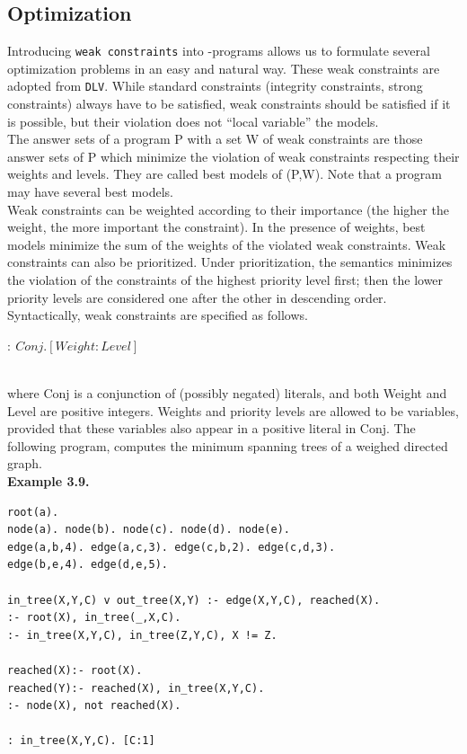 \documentclass[14pt,a4paper, titlepage]{article}
\begin{document}
\subsection{Optimization}
Introducing \texttt{weak constraints} into \hex-programs allows us to formulate several optimization problems in an easy and natural way. These weak constraints are adopted from \texttt{DLV}. While standard constraints (integrity constraints, strong constraints) always have to be satisfied, weak constraints should be satisfied if it is possible, but their violation does not \enquote{local variable} the models.\\The answer sets of a program P with a set W of weak constraints are those answer sets of P which minimize the violation of weak constraints respecting their weights and levels. They are called best models of (P,W). Note that a program may have several best models.\\ Weak constraints can be weighted according to their importance (the higher the weight, the more important the constraint). In the presence of weights, best models minimize the sum of the weights of the violated weak constraints. Weak constraints can also be prioritized. Under prioritization, the semantics minimizes the violation of the constraints of the highest priority level first; then the lower priority levels are considered one after the other in descending order. Syntactically, weak constraints are specified as follows. \\ \centerline{$:~ Conj. [Weight:Level]$} \\ where Conj is a conjunction of (possibly negated) literals, and both Weight and Level are positive integers. Weights and priority levels are allowed to be variables, provided that these variables also appear in a positive literal in Conj.
The following program, computes the minimum spanning trees of a weighed directed graph.
\\ \textbf{Example 3.9.}
\begin{lstlisting}
root(a).
node(a). node(b). node(c). node(d). node(e).
edge(a,b,4). edge(a,c,3). edge(c,b,2). edge(c,d,3). 
edge(b,e,4). edge(d,e,5).

in_tree(X,Y,C) v out_tree(X,Y) :- edge(X,Y,C), reached(X).
:- root(X), in_tree(_,X,C).
:- in_tree(X,Y,C), in_tree(Z,Y,C), X != Z.

reached(X):- root(X).
reached(Y):- reached(X), in_tree(X,Y,C).
:- node(X), not reached(X).

: in_tree(X,Y,C). [C:1]
\end{lstlisting}
\end{document}
